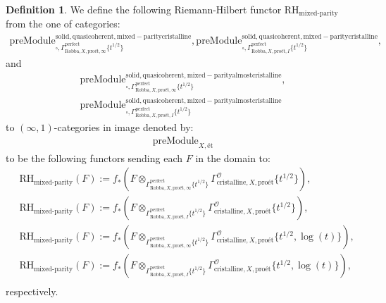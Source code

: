 \documentclass[12pt]{book}
\theoremstyle{definition}
\newtheorem{definition}{Definition}
\begin{document}
\begin{definition}
We define the following Riemann-Hilbert functor $\text{RH}_\text{mixed-parity}$ from the one of categories:
\begin{align}
\mathrm{preModule}^\mathrm{solid,quasicoherent,mixed-paritycristalline}_{\square,\Gamma^\mathrm{perfect}_{\text{Robba},X,\text{pro\'et},\infty}\{t^{1/2}\}},
\mathrm{preModule}^\mathrm{solid,quasicoherent,mixed-paritycristalline}_{\square,\Gamma^\mathrm{perfect}_{\text{Robba},X,\text{pro\'et},I}\{t^{1/2}\}}, 
\end{align}
and
\begin{align}
\mathrm{preModule}^\mathrm{solid,quasicoherent,mixed-parityalmostcristalline}_{\square,\Gamma^\mathrm{perfect}_{\text{Robba},X,\text{pro\'et},\infty}\{t^{1/2}\}},\\
\mathrm{preModule}^\mathrm{solid,quasicoherent,mixed-parityalmostcristalline}_{\square,\Gamma^\mathrm{perfect}_{\text{Robba},X,\text{pro\'et},I}\{t^{1/2}\}} 
\end{align}
to $(\infty,1)$-categories in image denoted by:
\begin{align}
\mathrm{preModule}_{X,\text{\'et}}
\end{align}
to be the following functors sending each $F$ in the domain to:
\begin{align}
&\text{RH}_\text{mixed-parity}(F):=f_*(F\otimes_{\Gamma^\mathrm{perfect}_{\text{Robba},X,\text{pro\'et},\infty}\{t^{1/2}\}} \Gamma^\mathcal{O}_{\text{cristalline},X,\text{pro\'et}}\{t^{1/2}\}),\\
&\text{RH}_\text{mixed-parity}(F):=f_*(F\otimes_{\Gamma^\mathrm{perfect}_{\text{Robba},X,\text{pro\'et},I}\{t^{1/2}\}} \Gamma^\mathcal{O}_{\text{cristalline},X,\text{pro\'et}}\{t^{1/2}\}),\\
&\text{RH}_\text{mixed-parity}(F):=f_*(F\otimes_{\Gamma^\mathrm{perfect}_{\text{Robba},X,\text{pro\'et},\infty}\{t^{1/2}\}} \Gamma^\mathcal{O}_{\text{cristalline},X,\text{pro\'et}}\{t^{1/2},\log(t)\}),\\
&\text{RH}_\text{mixed-parity}(F):=f_*(F\otimes_{\Gamma^\mathrm{perfect}_{\text{Robba},X,\text{pro\'et},I}\{t^{1/2}\}} \Gamma^\mathcal{O}_{\text{cristalline},X,\text{pro\'et}}\{t^{1/2},\log(t)\}),\\
\end{align}
respectively.

\end{definition}
\end{document}
